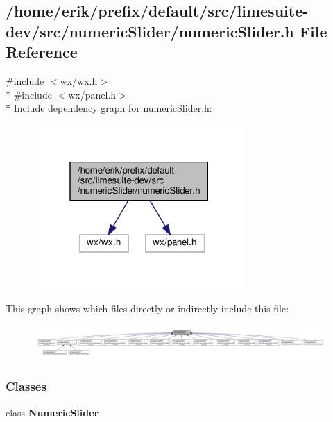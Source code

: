 \subsection{/home/erik/prefix/default/src/limesuite-\/dev/src/numeric\+Slider/numeric\+Slider.h File Reference}
\label{numericSlider_8h}
{\ttfamily \#include $<$wx/wx.\+h$>$}\\*
{\ttfamily \#include $<$wx/panel.\+h$>$}\\*
Include dependency graph for numeric\+Slider.\+h\+:
\nopagebreak
\begin{figure}[H]
\begin{center}
\leavevmode
\includegraphics[width=229pt]{db/dd2/numericSlider_8h__incl}
\end{center}
\end{figure}
This graph shows which files directly or indirectly include this file\+:
\nopagebreak
\begin{figure}[H]
\begin{center}
\leavevmode
\includegraphics[width=350pt]{d4/d0b/numericSlider_8h__dep__incl}
\end{center}
\end{figure}
\subsubsection*{Classes}
\begin{DoxyCompactItemize}
\item 
class {\bf Numeric\+Slider}
\end{DoxyCompactItemize}
